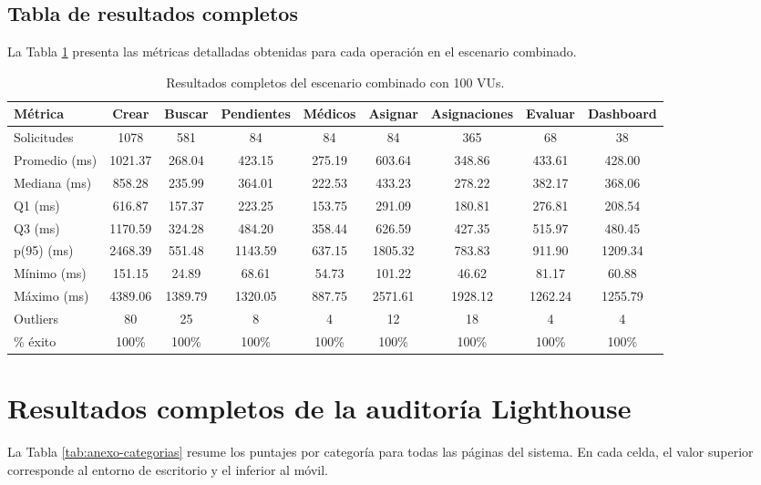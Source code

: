 \subsection{Tabla de resultados completos}

La Tabla \ref{tab:anexo-combinado} presenta las métricas detalladas obtenidas para cada operación en el escenario combinado.

\begin{table}[H]
\centering
\caption{Resultados completos del escenario combinado con 100 VUs.}
\label{tab:anexo-combinado}
\footnotesize
\begin{tabular}{lcccccccc}
\hline
\textbf{Métrica} & Crear & Buscar & Pendientes & Médicos & Asignar & Asignaciones & Evaluar & Dashboard \\
\hline
Solicitudes & 1078 & 581 & 84 & 84 & 84 & 365 & 68 & 38 \\
Promedio (ms) & 1021.37 & 268.04 & 423.15 & 275.19 & 603.64 & 348.86 & 433.61 & 428.00 \\
Mediana (ms) & 858.28 & 235.99 & 364.01 & 222.53 & 433.23 & 278.22 & 382.17 & 368.06 \\
Q1 (ms) & 616.87 & 157.37 & 223.25 & 153.75 & 291.09 & 180.81 & 276.81 & 208.54 \\
Q3 (ms) & 1170.59 & 324.28 & 484.20 & 358.44 & 626.59 & 427.35 & 515.97 & 480.45 \\
p(95) (ms) & 2468.39 & 551.48 & 1143.59 & 637.15 & 1805.32 & 783.83 & 911.90 & 1209.34 \\
Mínimo (ms) & 151.15 & 24.89 & 68.61 & 54.73 & 101.22 & 46.62 & 81.17 & 60.88 \\
Máximo (ms) & 4389.06 & 1389.79 & 1320.05 & 887.75 & 2571.61 & 1928.12 & 1262.24 & 1255.79 \\
Outliers & 80 & 25 & 8 & 4 & 12 & 18 & 4 & 4 \\
\% éxito & 100\% & 100\% & 100\% & 100\% & 100\% & 100\% & 100\% & 100\% \\
\hline
\end{tabular}
\end{table}

\section{Resultados completos de la auditoría Lighthouse}
\label{anexo:lighthouse}

La Tabla \ref{tab:anexo-categorias} resume los puntajes por categoría para todas las páginas del sistema. En cada celda, el valor superior corresponde al entorno de escritorio y el inferior al móvil.

